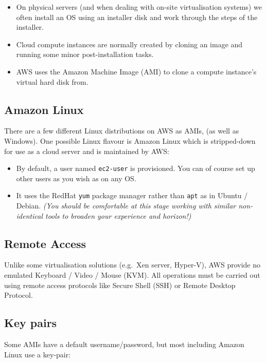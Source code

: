 \begin{itemize}
\item
  On physical servers (and when dealing with on-site virtualisation
  systems) we often install an OS using an installer disk and work
  through the steps of the installer.
\item
  Cloud compute instances are normally created by cloning an image and
  running some minor post-installation tasks.
\item
  AWS uses the Amazon Machine Image (AMI) to clone a compute instance's
  virtual hard disk from.
\end{itemize}

\subsection{Amazon Linux}\label{amazon-linux}

There are a few different Linux distributions on AWS as AMIs, (as well as Windows).
One possible Linux flavour is Amazon Linux which is stripped-down for use as a cloud server and is maintained by AWS:

\begin{itemize}
\item
  By default, a user named \texttt{ec2-user} is provisioned. You can of
  course set up other users as you wish as on any OS.
\item
  It uses the RedHat \texttt{yum} package manager rather than
  \texttt{apt} as in Ubuntu / Debian. \emph{(You should be comfortable
  at this stage working with similar non-identical tools to broaden your
  experience and horizon!)}
\end{itemize}

\subsection{Remote Access}\label{remote-access}

Unlike some virtualisation solutions (e.g.~Xen server, Hyper-V), AWS provide no emulated Keyboard / Video / Mouse (KVM).
All operations must be carried out using remote access protocols like Secure Shell (SSH) or Remote Desktop Protocol.

\subsection{Key pairs}
\label{sec:key-pairs}

Some AMIs have a default username/password, but most including Amazon
Linux use a key-pair:

